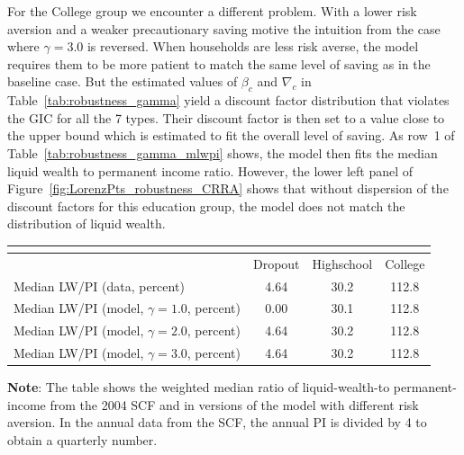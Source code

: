\documentclass{econsocart}
\begin{document}
For the College group we encounter a different problem.
With a lower risk aversion and a weaker precautionary saving motive the intuition from the case where $\gamma=3.0$ is reversed.
When households are less risk averse, the model requires them to be more patient to match the same level of saving as in the baseline case.
But the estimated values of $\beta_c$ and $\nabla_c$ in Table~\ref{tab:robustness_gamma} yield a discount factor distribution that violates the GIC for all the 7 types.
Their discount factor is then set to a value close to the upper bound which is estimated to fit the overall level of saving.
As row~1 of Table~\ref{tab:robustness_gamma_mlwpi} shows, the model then fits the median liquid wealth to permanent income ratio.
However, the lower left panel of Figure~\ref{fig:LorenzPts_robustness_CRRA} shows that without dispersion of the discount factors for this education group, the model does not match the distribution of liquid wealth.

\begin{center}
  \begin{tabular}{lccc}
    \multicolumn{4}{l}{}                                                           \\ \midrule
                                                  & Dropout & Highschool & College \\ \midrule
    Median LW/PI (data, percent)                  & 4.64    & 30.2       & 112.8   \\
    Median LW/PI (model, $\gamma = 1.0$, percent) & 0.00    & 30.1       & 112.8   \\
    Median LW/PI (model, $\gamma = 2.0$, percent) & 4.64    & 30.2       & 112.8   \\
    Median LW/PI (model, $\gamma = 3.0$, percent) & 4.64    & 30.2       & 112.8   \\ \bottomrule
  \end{tabular}
  \label{tab:robustness_gamma_mlwpi}
  \parbox{15cm}{\small \vspace{.05cm} \textbf{Note}: The table shows the weighted median ratio of liquid-wealth-to permanent-income from the 2004 SCF and in versions of the model with different risk aversion.
    In the annual data from the SCF, the annual PI is divided by 4 to obtain a quarterly number.\normalsize}
\end{center}


\end{document}
